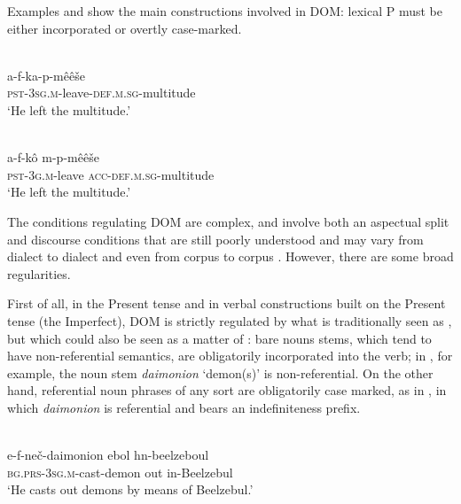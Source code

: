 \documentclass[output=paper]{LSP/langsci}
\begin{document}
Examples  and  show the main constructions involved in  DOM: lexical P must be either incorporated or overtly case-marked. 

\begin{exe}
\ex%
\label{05-gr-ex:16}
\\
\gll a-f-ka-p-mêêše\\
\textsc{pst-3sg.m-}leave\textsc{-def.m.sg}-multitude\\
\glt ‘He left the multitude.’ %
\end{exe}

\begin{exe}
\ex%
\label{05-gr-ex:17}
\\
\gll a-f-kô m-p-mêêše\\
\textsc{pst-3g.m}-leave \textsc{ acc-def.m.sg}-multitude\\
\glt ‘He left the multitude.’ %
\end{exe}

The conditions regulating  DOM are complex, and involve both an aspectual split and discourse conditions that are still poorly understood and may vary from dialect to dialect and even from corpus to corpus \citep{Engsheden2008Differential}. However, there are some broad regularities.

 First of all, in the Present tense and in verbal constructions built on the Present tense (\eg the Imperfect), DOM is strictly regulated by what is traditionally seen as , but which could also be seen as a matter of : bare nouns stems, which tend to have non-referential semantics, are obligatorily incorporated into the verb; in , for example, the noun stem \textit{daimonion} ‘demon(s)’ is non-referential. On the other hand, referential noun phrases of any sort are obligatorily case marked, as in , in which \textit{daimonion} is referential and bears an indefiniteness prefix.

\begin{exe}
\ex%
\label{05-gr-ex:18}
\\
\gll e-f-neč-daimonion ebol hn-beelzeboul\\
\textsc{bg.prs-3sg.m}-cast-demon out in-Beelzebul\\
\glt ‘He casts out demons by means of Beelzebul.’  %
\end{exe}
\end{document}
